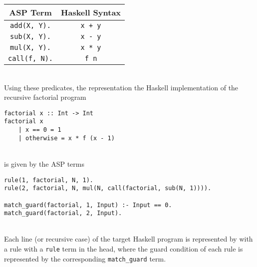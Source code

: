 \begin{center}
\begin{tabular}{| c | c |}
\hline
\textbf{ASP Term} & \textbf{Haskell Syntax} \\
\hline
\lstinline!add(X, Y).! & \lstinline!x + y! \\
\hline
\lstinline!sub(X, Y).! & \lstinline!x - y! \\
\hline
\lstinline!mul(X, Y).! & \lstinline!x * y! \\
\hline
\lstinline!call(f, N).! & \lstinline!f n! \\
\hline
\end{tabular}
\end{center}
\mbox{}\\
Using these predicates, the representation the Haskell implementation of the recursive factorial program \\
\begin{lstlisting}
factorial x :: Int -> Int
factorial x 
	| x == 0 = 1
	| otherwise = x * f (x - 1)
\end{lstlisting}
\mbox{}\\
is given by the ASP terms \\
\begin{lstlisting}
rule(1, factorial, N, 1).
rule(2, factorial, N, mul(N, call(factorial, sub(N, 1)))).

match_guard(factorial, 1, Input) :- Input == 0.
match_guard(factorial, 2, Input).
\end{lstlisting}
\mbox{}\\
Each line (or recursive case) of the target Haskell program is represented by with a rule with a \lstinline!rule! term in the head, where the guard condition of each rule is represented by the corresponding \lstinline!match_guard! term.

%

